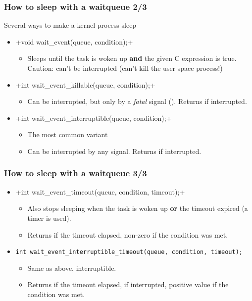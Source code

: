 \begin{frame}[fragile]
  \frametitle{How to sleep with a waitqueue 2/3}
  Several ways to make a kernel process sleep
  \begin{itemize}
  \item {}+void wait_event(queue, condition);+
    \begin{itemize}
    \item Sleeps until the task is woken up {\bf and} the given C
      expression is true. Caution: can't be interrupted (can't kill
      the user space process!)
    \end{itemize}
  \item {}+int wait_event_killable(queue, condition);+
    \begin{itemize}
    \item Can be interrupted, but only by a \emph{fatal} signal
      (). Returns \code{-} if interrupted.
    \end{itemize}
  \item {}+int wait_event_interruptible(queue, condition);+
    \begin{itemize}
    \item The most common variant
    \item Can be interrupted by any signal. Returns
      \code{-} if interrupted.
    \end{itemize}
  \end{itemize}
\end{frame}

\begin{frame}[fragile]
  \frametitle{How to sleep with a waitqueue 3/3}
  \begin{itemize}
  \item {}+int wait_event_timeout(queue, condition, timeout);+
    \begin{itemize}
    \item Also stops sleeping when the task is woken up {\bf or} the
      timeout expired (a timer is used).
    \item Returns  if the timeout elapsed, non-zero if
      the condition was met.
    \end{itemize}
  \item \begin{verbatim}
int wait_event_interruptible_timeout(queue, condition, timeout);
  \end{verbatim}
    \begin{itemize}
    \item Same as above, interruptible.
    \item Returns  if the timeout
      elapsed, \code{-} if interrupted, positive value if
      the condition was met.
    \end{itemize}
  \end{itemize}
\end{frame}

